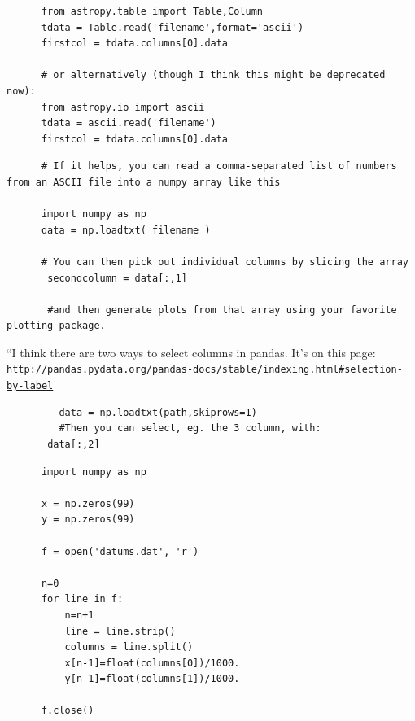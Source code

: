 \documentclass[11pt,a4paper]{article}
\begin{document}
    \begin{lstlisting}
      from astropy.table import Table,Column
      tdata = Table.read('filename',format='ascii')
      firstcol = tdata.columns[0].data
      
      # or alternatively (though I think this might be deprecated now):
      from astropy.io import ascii
      tdata = ascii.read('filename')
      firstcol = tdata.columns[0].data
    \end{lstlisting}
    \medskip     \medskip     \medskip


    \begin{lstlisting}
      # If it helps, you can read a comma-separated list of numbers from an ASCII file into a numpy array like this

      import numpy as np
      data = np.loadtxt( filename )
      
      # You can then pick out individual columns by slicing the array
       secondcolumn = data[:,1]
       
       #and then generate plots from that array using your favorite plotting package.
      \end{lstlisting}
      \medskip     \medskip     \medskip

      ``I think there are two ways to select columns in pandas. 
       It’s on this page: 
       \href{http://pandas.pydata.org/pandas-docs/stable/indexing.html\#selection-by-label}{\tt http://pandas.pydata.org/pandas-docs/stable/indexing.html\#selection-by-label}        \\
       \begin{lstlisting}
         data = np.loadtxt(path,skiprows=1)
         #Then you can select, eg. the 3 column, with:
       data[:,2]
      \end{lstlisting}
    \medskip     \medskip     \medskip


    \begin{lstlisting}
      import numpy as np

      x = np.zeros(99)
      y = np.zeros(99)
      
      f = open('datums.dat', 'r')
      
      n=0
      for line in f:
          n=n+1
          line = line.strip()
          columns = line.split()
          x[n-1]=float(columns[0])/1000.
          y[n-1]=float(columns[1])/1000.
          
      f.close()
    \end{lstlisting}
\end{document}
